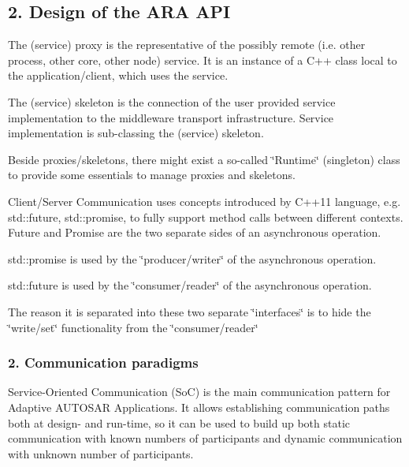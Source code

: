 \subsection*{2. Design of the A\+RA A\+PI}


\begin{DoxyItemize}
\item The (service) proxy is the representative of the possibly remote (i.\+e. other process, other core, other node) service. It is an instance of a C++ class local to the application/client, which uses the service.
\item The (service) skeleton is the connection of the user provided service implementation to the middleware transport infrastructure. Service implementation is sub-\/classing the (service) skeleton.
\item Beside proxies/skeletons, there might exist a so-\/called \char`\"{}\+Runtime\char`\"{} (singleton) class to provide some essentials to manage proxies and skeletons.
\item Client/\+Server Communication uses concepts introduced by C++11 language, e.\+g. std\+::future, std\+::promise, to fully support method calls between different contexts. Future and Promise are the two separate sides of an asynchronous operation.
\begin{DoxyItemize}
\item std\+::promise is used by the \char`\"{}producer/writer\char`\"{} of the asynchronous operation.
\item std\+::future is used by the \char`\"{}consumer/reader\char`\"{} of the asynchronous operation.
\item The reason it is separated into these two separate \char`\"{}interfaces\char`\"{} is to hide the \char`\"{}write/set\char`\"{} functionality from the \char`\"{}consumer/reader\char`\"{}
\end{DoxyItemize}
\end{DoxyItemize}

\subsubsection*{2. Communication paradigms}

Service-\/\+Oriented Communication (SoC) is the main communication pattern for Adaptive A\+U\+T\+O\+S\+AR Applications. It allows establishing communication paths both at design-\/ and run-\/time, so it can be used to build up both static communication with known numbers of participants and dynamic communication with unknown number of participants.

